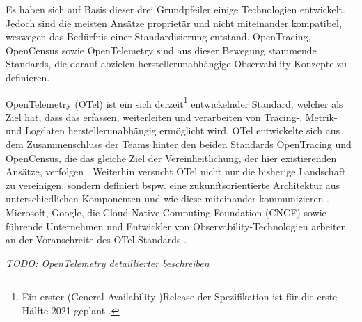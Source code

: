 
Es haben sich auf Basis dieser drei Grundpfeiler einige Technologien entwickelt. Jedoch sind die meisten Ansätze proprietär und nicht miteinander kompatibel, weswegen das Bedürfnis einer Standardisierung entstand. OpenTracing, OpenCensus \cite{OpenCensus} sowie OpenTelemetry \cite{OpenTelemetry} sind aus dieser Bewegung stammende Standards, die darauf abzielen herstellerunabhängige Observability-Konzepte zu definieren.

OpenTelemetry (OTel) ist ein sich derzeit\footnote{Ein erster (General-Availability-)Release der Spezifikation ist für die erste Hälfte 2021 geplant \cite{OpenTelemetryGARelease}.} entwickelnder Standard, welcher als Ziel hat, dass das erfassen, weiterleiten und verarbeiten von  Tracing-, Metrik- und Logdaten\footnotemark{} herstellerunabhängig ermöglicht wird. OTel entwickelte sich aus dem Zusammenschluss der Teams hinter den beiden Standards OpenTracing und OpenCensus, die das gleiche Ziel der Vereinheitlichung, der hier existierenden Ansätze, verfolgen  \cite{UseNixDistributiveTracing}. Weiterhin versucht OTel nicht nur die bisherige Landschaft zu vereinigen, sondern definiert bspw. eine zukunftsorientierte Architektur aus unterschiedlichen Komponenten und wie diese miteinander kommunizieren \cite{DistributedTracingInPractice}. Microsoft, Google, die Cloud-Native-Computing-Foundation (CNCF) sowie führende Unternehmen und Entwickler von Observability-Technologien arbeiten an der Voranschreite des OTel Standards \cite{DistributedTracingInPractice} \cite{OpenTelemetryCommunityMembers}.


 \textit{\color{red} TODO: OpenTelemetry detaillierter beschreiben}

